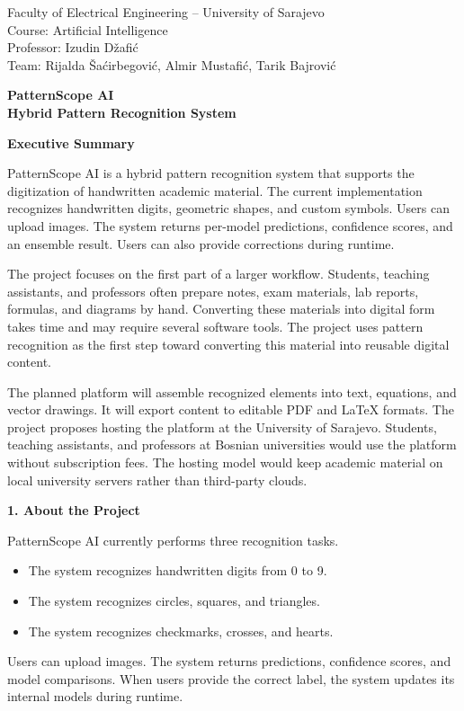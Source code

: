 \documentclass[9pt,a4paper]{extarticle}
\newcommand{\Sec}[1]{\vspace{2pt}\noindent\textbf{#1}\par\vspace{2pt}}
\begin{document}
\fontsize{8.6}{10.2}\selectfont

Faculty of Electrical Engineering – University of Sarajevo\\
Course: Artificial Intelligence\\
Professor: Izudin Džafić\\
Team: Rijalda Šaćirbegović, Almir Mustafić, Tarik Bajrović

\vfill
\begin{center}
{\fontsize{17}{20}\selectfont\textbf{PatternScope AI}}\\[8pt]
{\fontsize{12}{15}\selectfont\textbf{Hybrid Pattern Recognition System}}
\end{center}
\vfill
\newpage

\Sec{Executive Summary}
PatternScope AI is a hybrid pattern recognition system that supports the digitization of handwritten academic material. The current implementation recognizes handwritten digits, geometric shapes, and custom symbols. Users can upload images. The system returns per-model predictions, confidence scores, and an ensemble result. Users can also provide corrections during runtime.

The project focuses on the first part of a larger workflow. Students, teaching assistants, and professors often prepare notes, exam materials, lab reports, formulas, and diagrams by hand. Converting these materials into digital form takes time and may require several software tools. The project uses pattern recognition as the first step toward converting this material into reusable digital content.

The planned platform will assemble recognized elements into text, equations, and vector drawings. It will export content to editable PDF and LaTeX formats. The project proposes hosting the platform at the University of Sarajevo. Students, teaching assistants, and professors at Bosnian universities would use the platform without subscription fees. The hosting model would keep academic material on local university servers rather than third-party clouds.

\Sec{1. About the Project}
PatternScope AI currently performs three recognition tasks.
\begin{itemize}
\item The system recognizes handwritten digits from 0 to 9.
\item The system recognizes circles, squares, and triangles.
\item The system recognizes checkmarks, crosses, and hearts.
\end{itemize}
Users can upload images. The system returns predictions, confidence scores, and model comparisons. When users provide the correct label, the system updates its internal models during runtime.
\end{document}

